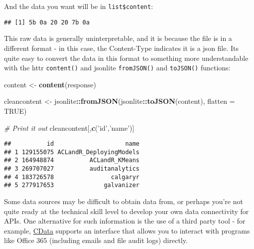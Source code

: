 \documentclass[
]{book}
\newenvironment{Shaded}{\begin{snugshade}}{\end{snugshade}}
\newcommand{\CommentTok}[1]{\textcolor[rgb]{0.56,0.35,0.01}{\textit{#1}}}
\newcommand{\DataTypeTok}[1]{\textcolor[rgb]{0.13,0.29,0.53}{#1}}
\newcommand{\KeywordTok}[1]{\textcolor[rgb]{0.13,0.29,0.53}{\textbf{#1}}}
\newcommand{\NormalTok}[1]{#1}
\newcommand{\OperatorTok}[1]{\textcolor[rgb]{0.81,0.36,0.00}{\textbf{#1}}}
\newcommand{\OtherTok}[1]{\textcolor[rgb]{0.56,0.35,0.01}{#1}}
\newcommand{\StringTok}[1]{\textcolor[rgb]{0.31,0.60,0.02}{#1}}
\begin{document}
And the data you want will be in \texttt{list\$content}:

\begin{Shaded}
\end{Shaded}

\begin{verbatim}
## [1] 5b 0a 20 20 7b 0a
\end{verbatim}

This raw data is generally uninterpretable, and it is because the file is in a different format - in this case, the Content-Type indicates it is a json file. Its quite easy to convert the data in this format to something more understandable with the httr \texttt{content()} and jsonlite \texttt{fromJSON()} and \texttt{toJSON()} functions:

\begin{Shaded}
\begin{Highlighting}[]
\NormalTok{content <-}\StringTok{ }\KeywordTok{content}\NormalTok{(response)}

\NormalTok{cleancontent <-}\StringTok{ }\NormalTok{jsonlite}\OperatorTok{::}\KeywordTok{fromJSON}\NormalTok{(jsonlite}\OperatorTok{::}\KeywordTok{toJSON}\NormalTok{(content), }\DataTypeTok{flatten =} \OtherTok{TRUE}\NormalTok{)}

\CommentTok{# Print it out}
\NormalTok{cleancontent[,}\KeywordTok{c}\NormalTok{(}\StringTok{'id'}\NormalTok{,}\StringTok{'name'}\NormalTok{)]}
\end{Highlighting}
\end{Shaded}

\begin{verbatim}
##          id                    name
## 1 129155075 ACLandR_DeployingModels
## 2 164948874          ACLandR_KMeans
## 3 269707027          auditanalytics
## 4 183726578                calgaryr
## 5 277917653              galvanizer
\end{verbatim}

Some data sources may be difficult to obtain data from, or perhaps you're not quite ready at the technical skill level to develop your own data connectivity for APIs. One alternative for such information is the use of a third party tool - for example, \href{https://www.cdata.com/kb/tech/office365-jdbc-r.rst}{CData} supports an interface that allows you to interact with programs like Office 365 (including emails and file audit logs) directly.
\end{document}
